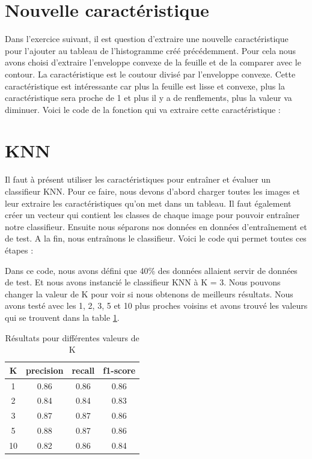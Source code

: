 \section{Nouvelle caractéristique}

Dans l'exercice suivant, il est question d'extraire une nouvelle caractéristique pour l'ajouter au tableau de l'histogramme créé précédemment. Pour cela nous avons choisi d'extraire l'enveloppe convexe de la feuille et de la comparer avec le contour. La caractéristique est le coutour divisé par l'enveloppe convexe. Cette caractéristique est intéressante car plus la feuille est lisse et convexe, plus la caractéristique sera proche de 1 et plus il y a de renflements, plus la valeur va diminuer. Voici le code de la fonction qui va extraire cette caractéristique : 




\section{KNN}

Il faut à présent utiliser les caractéristiques pour entraîner et évaluer un classifieur KNN. Pour ce faire, nous devons d'abord charger toutes les images et leur extraire les caractéristiques qu'on met dans un tableau. Il faut également créer un vecteur qui contient les classes de chaque image pour pouvoir entraîner notre classifieur. Ensuite nous séparons nos données en données d'entraînement et de test. A la fin, nous entraînons le classifieur. Voici le code qui permet toutes ces étapes : 



Dans ce code, nous avons défini que 40\% des données allaient servir de données de test. Et nous avons instancié le classifieur KNN à K = 3. Nous pouvons changer la valeur de K pour voir si nous obtenons de meilleurs résultats. Nous avons testé avec les 1, 2, 3, 5 et 10 plus proches voisins et avons trouvé les valeurs qui se trouvent dans la table \ref{valuestabforKNN}.

\begin{table}[h]
  \centering
  \footnotesize
  \begin{tabular}{|c|c|c|c|}  
    \hline
    K & precision & recall & f1-score \\
    \hline
    1 & 0.86 & 0.86 & 0.86 \\
    2 & 0.84 & 0.84 & 0.83 \\
    3 & 0.87 & 0.87 & 0.86 \\
    \rowcolor{very-light-gray}
    5 & 0.88 & 0.87 & 0.86 \\
    10 & 0.82 & 0.86 & 0.84 \\
    \hline
  \end{tabular}
  \label{valuestabforKNN}
  \caption{Résultats pour différentes valeurs de K}
\end{table}

